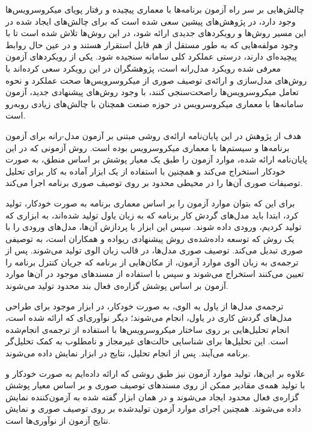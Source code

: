 چالش‌هایی بر سر راه آزمون برنامه‌ها با معماری پیچیده و رفتار پویای میکروسرویس‌ها وجود دارد، در پژوهش‌های پیشین سعی شده است که برای چالش‌های ایجاد شده در این مسیر روش‌ها و رویکردهای جدیدی ارائه شود، در این روش‌ها تلاش شده است تا با وجود مولفه‌هایی که به طور مستقل از هم قابل استقرار هستند و در عین حال روابط پیچیده‌ای دارند، درستی عملکرد کلی سامانه سنجیده شود. یکی از رویکردهای آزمون معرفی شده رویکرد مدل‌رانه است، پژوهشگران در این رویکرد سعی کرده‌اند با روش‌های مدل‌سازی و ارائه‌ی توصیف صوری از میکروسرویس‌ها صحت عملکرد و نحوه تعامل میکروسرویس‌ها راصحت‌سنجی کنند، با وجود روش‌های پیشنهادی جدید، آزمون سامانه‌ها با معماری میکروسرویس در حوزه صنعت همچنان با چالش‌های زیادی روبه‌رو است. 



هدف از پژوهش در این پایان‌نامه ارائه‌ی روشی مبتنی بر آزمون مدل-رانه برای آزمون برنامه‌ها و سیستم‌ها با معماری میکروسرویس بوده‌ است. روش آزمونی که در این پایان‌نامه ارائه شده، موارد آزمون را طبق یک معیار پوشش بر اساس منطق، به صورت خودکار استخراج می‌کند و همچنین با استفاده از یک ابزار آماده به کار برای تحلیل توصیفات صوری آن‌ها را در محیطی محدود بر روی توصیف صوری برنامه اجرا می‌کند.

برای این که بتوان موارد آزمون را بر اساس معماری برنامه به صورت خودکار، تولید کرد، ابتدا باید مدل‌های گردش کار برنامه که به زبان یاول تولید شده‌اند، به ابزاری که تولید کردیم، ورودی داده شوند. سپس این ابزار با پردازش آن‌ها، مدل‌های ورودی را با یک روش که توسعه داده‌شده‌ی روش پیشنهادی ریواده و همکاران است، به توصیفی صوری تبدیل می‌کند. توصیف صوری مدل‌ها، در قالب زبان الوی  تولید می‌شوند. پس از ترجمه‌ی به زبان الوی موارد آزمون، از مکان‌هایی از برنامه که جریان کنترل برنامه را تعیین می‌کنند استخراج می‌شوند و سپس با استفاده از مسندهای موجود در آن‌ها موارد آزمون بر اساس پوشش گزاره‌ی فعال بند محدود تولید می‌‌شوند.

ترجمه‌ی مدل‌ها از یاول به الوی، به صورت خودکار، در ابزار موجود برای طراحی مدل‌های گردش کاری در یاول، انجام می‌شوند؛ دیگر نوآوری‌ای که ارائه شده است، انجام تحلیل‌هایی بر روی ساختار میکروسرویس‌ها با استفاده از ترجمه‌ی انجام‌شده است. این تحلیل‌ها برای شناسایی حالت‌های غیرمجاز و نامطلوب به کمک تحلیل‌گر برنامه می‌آیند. پس از انجام تحلیل، نتایج در ابزار نمایش داده می‌شوند.

علاوه بر این‌ها، تولید موارد آزمون نیز طبق روشی که ارائه داده‌ایم به صورت خودکار و با تولید همه‌ی مقادیر ممکن از روی مسندهای توصیف صوری و بر اساس معیار پوشش گزاره‌ی فعال محدود ایجاد می‌شوند و در همان ابزار گفته شده به آزمون‌کننده‌ نمایش داده می‌شوند. همچنین اجرای موارد آزمون تولید‌شده بر روی توصیف صوری و نمایش نتایج آزمون از نوآوری‌ها است.\newline\newline


